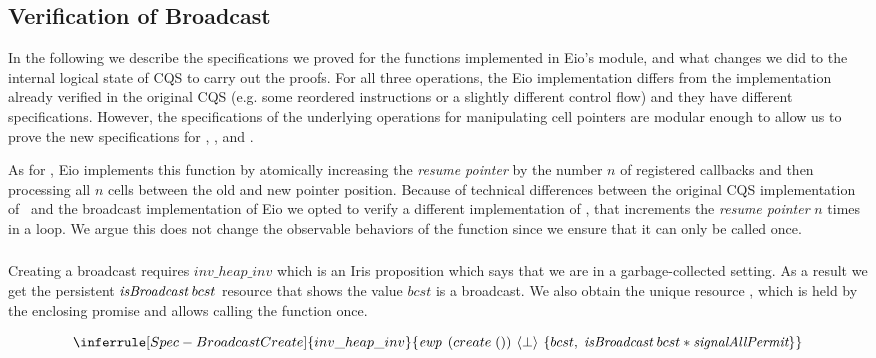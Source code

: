 \subsection{Verification of Broadcast}
\label{sec:broadcast-spec}

In the following we describe the specifications we proved for the functions implemented in Eio's  module, and what changes we did to the internal logical state of CQS to carry out the proofs.
For all three operations, the Eio implementation differs from the implementation already verified in the original CQS (e.g. some reordered instructions or a slightly different control flow) and they have different specifications.
However, the specifications of the underlying operations for manipulating cell pointers are modular enough to allow us to prove the new specifications for , , and .

As for , Eio implements this function by atomically increasing the \emph{resume pointer} by the number \(n\) of registered callbacks and then processing all \(n\) cells between the old and new pointer position.
Because of technical differences between the original CQS implementation of~\cite{koval2023cqs} and the broadcast implementation of Eio we opted to verify a different implementation of , that increments the \emph{resume pointer} \(n\) times in a loop.
We argue this does not change the observable behaviors of the function since we ensure that it can only be called once.

\subsubsection{}
\label{sec:broadcast-spec-create}

Creating a broadcast requires \(inv\_heap\_inv\) which is an Iris proposition which says that we are in a garbage-collected setting.
As a result we get the persistent \(\emph{isBroadcast}{}\; bcst\) resource that shows the value \(bcst\) is a broadcast.
We also obtain the unique resource \gssignal{}, which is held by the enclosing promise and allows calling the  function once.

\[
  \inferrule[Spec-BroadcastCreate]
  {inv\_heap\_inv}
  {\ewp{create\; ()}{\bot}{bcst,\; \gsIsBcst{}\; bcst \ast \gssignal{}}}
\]

\subsubsection{}
\label{sec:broadcast-spec-suspend}

